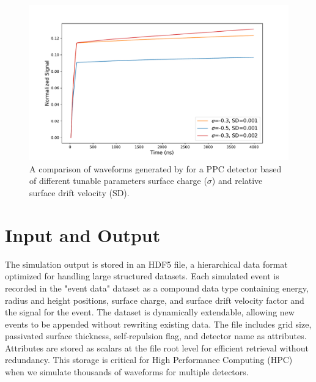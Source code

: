 \begin{figure}[!htb]
    \includegraphics[trim={0.1cm 0.3cm 1.3cm 0.3cm},clip,width=0.99\linewidth]{ch3/figs/wf_comp.pdf}
    \caption{A comparison of waveforms generated by {\tdsim} for a {\Ltwo} PPC detector based of different tunable parameters surface charge ($\sigma$) and relative surface drift velocity (SD).}
    \label{fig:wf_comp}
\end{figure}



\section{Input and Output}

The simulation output is stored in an HDF5 file, a hierarchical data format optimized for handling large structured datasets. Each simulated event is recorded in the "event data" dataset as a compound data type containing energy, radius and height positions, surface charge, and surface drift velocity factor and the signal for the event. The dataset is dynamically extendable, allowing new events to be appended without rewriting existing data. The file includes grid size, passivated surface thickness, self-repulsion flag, and detector name as attributes. Attributes are stored as scalars at the file root level for efficient retrieval without redundancy. This storage is critical for High Performance Computing (HPC) when we simulate thousands of waveforms for multiple detectors.
 